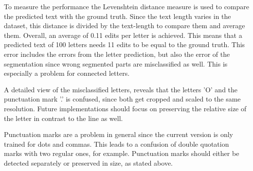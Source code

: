 \documentclass[english, paper=a4]{scrartcl}
\begin{document}
To measure the performance the Levenshtein distance measure is used to compare the predicted text with the ground truth. Since the text length varies in the dataset, this distance is divided by the text-length to compare them and average them. Overall, an average of 0.11 edits per letter is achieved. This means that a predicted text of 100 letters needs 11 edits to be equal to the ground truth. This error includes the errors from the letter prediction, but also the error of the segmentation since wrong segmented parts are misclassified as well. This is especially a problem for connected letters.

A detailed view of the misclassified letters, reveals that the letters 'O' and the punctuation mark '.' is confused, since both get cropped and scaled to the same resolution. Future implementations should focus on preserving the relative size of the letter in contrast to the line as well. 

Punctuation marks are a problem in general since the current version is only trained for dots and commas. This leads to a confusion of double quotation marks with two regular ones, for example. Punctuation marks should either be detected separately or preserved in size, as stated above.



\end{document}
